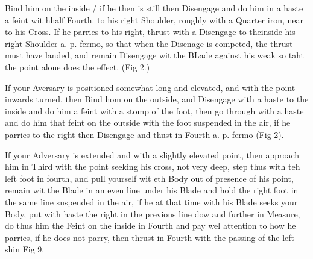 \exercise{}
Bind him on the inside / if he then is still then Disengage and do him
in a haste a feint wit hhalf Fourth. to his right Shoulder, roughly
with a Quarter iron, near to his Cross. If he parries to his right,
thrust with a Disengage to theinside his right Shoulder a. p. fermo,
so that when the Disenage is competed, the thrust must have landed,
and remain Disengage wit the BLade against his weak so taht the point
alone does the effect. (Fig 2.)

If your Aversary is positioned somewhat long and elevated, and with
the point inwards turned, then Bind hom on the outside, and Disengage
with a haste to the inside and do him a feint with a stomp of the
foot, then go through with a haste and do him that feint on the
outside with the foot suspended in the air, if he parries to the right
then Disengage and thust in Fourth a. p. fermo (Fig 2).

\exercise{}
If your Adversary is extended and with a slightly elevated point, then
approach him in Third with the point seeking his cross, not very deep,
step thus with teh left foot in fourth, and pull yourself wit eth Body
out of presence of his point, remain wit the Blade in an even line
under his Blade and hold the right foot in the same line suspended in
the air, if he at that time with his Blade seeks your Body, put with
haste the right in the previous line dow and further in Measure, do
thus him the Feint on the inside in Fourth and pay wel attention to
how he parries, if he does not parry, then thrust in Fourth with the
passing of the left shin Fig 9.

